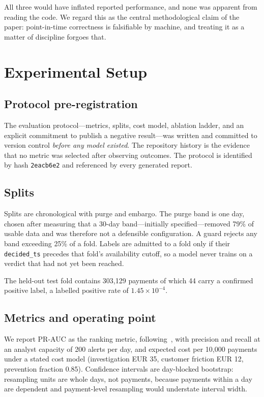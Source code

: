 \documentclass[conference]{IEEEtran}
\begin{document}
All three would have inflated reported performance, and none was apparent from
reading the code. We regard this as the central methodological claim of the
paper: point-in-time correctness is falsifiable by machine, and treating it as a
matter of discipline forgoes that.

\section{Experimental Setup}
\label{sec:setup}

\subsection{Protocol pre-registration}

The evaluation protocol---metrics, splits, cost model, ablation ladder, and an
explicit commitment to publish a negative result---was written and committed to
version control \emph{before any model existed}. The repository history is the
evidence that no metric was selected after observing outcomes. The protocol is
identified by hash \texttt{2eacb6e2} and referenced by every generated report.

\subsection{Splits}

Splits are chronological with purge and embargo. The purge band is one day,
chosen after measuring that a 30-day band---initially specified---removed 79\%
of usable data and was therefore not a defensible configuration. A guard rejects
any band exceeding 25\% of a fold. Labels are admitted to a fold only if their
\texttt{decided\_ts} precedes that fold's availability cutoff, so a model never
trains on a verdict that had not yet been reached.

The held-out test fold contains 303{,}129 payments of which 44 carry a
confirmed positive label, a labelled positive rate of $1.45\times10^{-4}$.

\subsection{Metrics and operating point}

We report PR-AUC as the ranking metric, following~\cite{saito2015prauc}, with
precision and recall at an analyst capacity of 200 alerts per day, and expected
cost per 10{,}000 payments under a stated cost model (investigation EUR 35,
customer friction EUR 12, prevention fraction 0.85). Confidence intervals are
day-blocked bootstrap: resampling units are whole days, not payments, because
payments within a day are dependent and payment-level resampling would
understate interval width.
\end{document}
